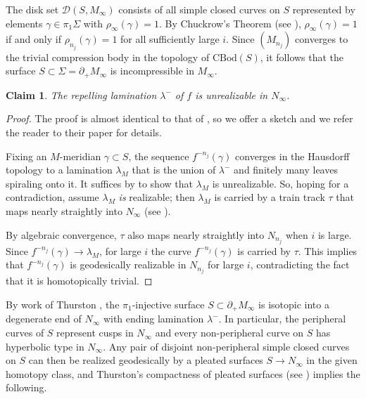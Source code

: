 \documentclass[12pt]{amsart}
\newtheorem{claim}[theorem]{Claim}
\theoremstyle{definition}
\theoremstyle{remark}
\begin{document}
The disk set $\mathcal D(S,M_\infty)$ consists of all simple closed curves on $S $ represented by elements $\gamma \in \pi_1 \Sigma$ with $\rho_\infty (\gamma)=1$.  By Chuckrow's Theorem (see \cite [Lemma 2.11]{Biringerextending}), $\rho_\infty(\gamma)=1$ if and only if $\rho_{n_j}(\gamma)=1$ for all sufficiently large $i $. Since $(M_{n_j})$ converges to the trivial compression body in the topology of $\mathrm{CBod}(S)$, it follows that the surface $S\subset \Sigma=\partial_+ M_\infty $ is incompressible in $M_\infty$.

\begin {claim}
The repelling lamination $\lambda  ^ - $ of $f$ is unrealizable in $N_\infty$.
\end {claim}

\begin {proof}
The proof is almost identical to that of \cite [Lemma 6.2] {Biringerextending}, so we offer a sketch and we refer the reader to their paper for details.  

Fixing an $M$-meridian $\gamma \subset S$, the sequence $f^{-n_j}(\gamma)$ converges in the Hausdorff topology to a lamination $\lambda_M$ that is the union of $\lambda  ^ - $ and finitely many leaves spiraling onto it.  It suffices by \cite [Theorem 2.3] {Brockcontinuity} to show that $\lambda_M $ is unrealizable.  So, hoping for a contradiction, assume $\lambda_M $ \emph {is} realizable; then $\lambda_M $ is carried by a train track $\tau $ that maps nearly straightly into $N_\infty $ (see \cite{Biringerextending}).  

By algebraic convergence, $\tau $ also maps nearly straightly into $N_{n_j}$ when $i $ is large.   Since $f^{-n_j}(\gamma) \to\lambda_M $, for large $i $ the curve $f^{-n_j}(\gamma)$ is carried by $\tau $.  This implies that $f^{-n_j}(\gamma)$ is geodesically realizable in $N_{n_j}$ for large $i $, contradicting the fact that it is homotopically trivial.
\end {proof}

By work of Thurston \cite [Prop 9.7.1] {Thurstongeometry}, the $\pi_1$-injective surface $S\subset \partial_+M_\infty$ is isotopic into a degenerate end of $N_\infty$ with ending lamination $\lambda  ^ -$.  In particular, the peripheral curves of  $S  $ represent cusps in $N_\infty$ and every non-peripheral curve on $S $ has hyperbolic type in $N_\infty $.  Any pair of disjoint non-peripheral simple closed curves on $S  $ can then be realized geodesically by a pleated surfaces $S  \longrightarrow N_\infty $ in the given homotopy class, and Thurston's compactness of pleated surfaces (see \cite [Lemma 6.13] {Matsuzakihyperbolic}) implies the following.
\end{document}
